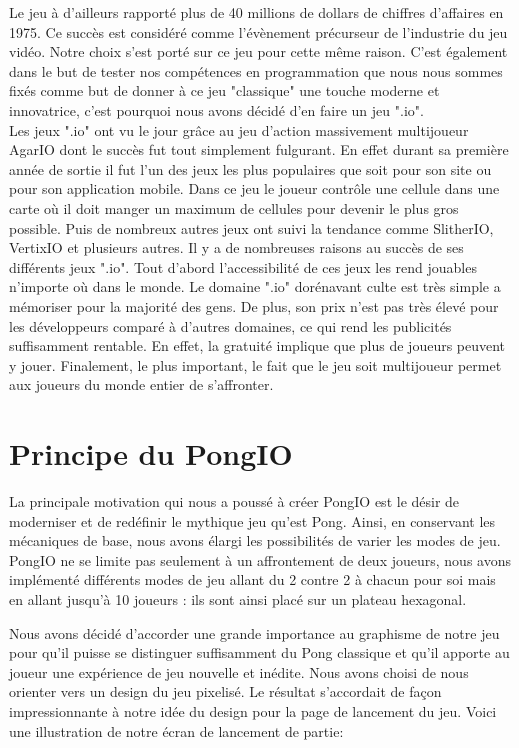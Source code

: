 Le jeu à d'ailleurs rapporté plus de 40 millions de dollars de chiffres d'affaires en 1975. Ce succès est considéré comme l'évènement précurseur de l'industrie du jeu vidéo. Notre choix s'est porté sur ce jeu pour cette même raison. C'est également dans le but de tester nos compétences en programmation que nous nous sommes fixés comme but de donner à ce jeu "classique" une touche moderne et innovatrice, c'est pourquoi nous avons décidé d'en faire un jeu ".io".\\
Les jeux ".io" ont vu le jour grâce au jeu d'action massivement multijoueur AgarIO dont le succès fut tout simplement fulgurant. En effet durant sa première année de sortie il fut l'un des jeux les plus populaires que soit pour son site ou pour son application mobile. Dans ce jeu le joueur contrôle une cellule dans une carte où il doit manger un maximum de cellules pour devenir le plus gros possible. Puis de nombreux autres jeux ont suivi la tendance comme SlitherIO, VertixIO et plusieurs autres. Il y a de nombreuses raisons au succès de ses différents jeux ".io". Tout d'abord l'accessibilité de ces jeux les rend jouables n'importe où dans le monde. Le domaine ".io" dorénavant culte est très simple a mémoriser pour la majorité des gens. De plus, son prix n'est pas très élevé pour les développeurs comparé à d'autres domaines, ce qui rend les publicités suffisamment rentable. En effet, la gratuité implique que plus de joueurs peuvent y jouer. Finalement, le plus important, le fait que le jeu soit multijoueur permet aux joueurs du monde entier de s'affronter.\\


\section{Principe du PongIO}


La principale motivation qui nous a poussé à créer PongIO est le désir de moderniser et de redéfinir le mythique jeu qu'est Pong. Ainsi, en conservant les mécaniques de base, nous avons élargi les possibilités de varier les modes de jeu. PongIO ne se limite pas seulement à un affrontement de deux joueurs, nous avons implémenté différents modes de jeu allant du 2 contre 2 à chacun pour soi mais en allant jusqu'à 10 joueurs : ils sont ainsi placé sur un plateau hexagonal.


Nous avons décidé d'accorder une grande importance au graphisme de notre jeu pour qu'il puisse se distinguer suffisamment du Pong classique et qu'il apporte au joueur une expérience de jeu nouvelle et inédite. Nous avons choisi de nous orienter vers un design du jeu pixelisé. Le résultat s'accordait de façon impressionnante à notre idée du design pour la page de lancement du jeu. Voici une illustration de notre écran de lancement de partie:

